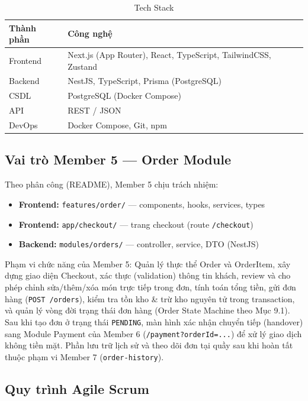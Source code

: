 \documentclass[12pt,a4paper]{article}
\begin{document}
\begin{table}[H]
\centering
\caption{Tech Stack}
\begin{tabularx}{\textwidth}{lX}
\toprule
\textbf{Thành phần} & \textbf{Công nghệ} \\
\midrule
Frontend  & Next.js (App Router), React, TypeScript, TailwindCSS, Zustand \\
Backend   & NestJS, TypeScript, Prisma (PostgreSQL) \\
CSDL      & PostgreSQL (Docker Compose) \\
API       & REST / JSON \\
DevOps    & Docker Compose, Git, npm \\
\bottomrule
\end{tabularx}
\end{table}

\subsection{Vai trò Member 5 — Order Module}

Theo phân công (README), Member 5 chịu trách nhiệm:
\begin{itemize}
  \item \textbf{Frontend:} \texttt{features/order/} — components, hooks, services, types
  \item \textbf{Frontend:} \texttt{app/checkout/} — trang checkout (route \texttt{/checkout})
  \item \textbf{Backend:} \texttt{modules/orders/} — controller, service, DTO (NestJS)
\end{itemize}

Phạm vi chức năng của Member 5: Quản lý thực thể Order và OrderItem, xây dựng giao diện Checkout, xác thực (validation) thông tin khách, review và cho phép chỉnh sửa/thêm/xóa món trực tiếp trong đơn, tính toán tổng tiền, gửi đơn hàng (\texttt{POST /orders}), kiểm tra tồn kho \& trừ kho nguyên tử trong transaction, và quản lý vòng đời trạng thái đơn hàng (Order State Machine theo Mục 9.1). Sau khi tạo đơn ở trạng thái \texttt{PENDING}, màn hình xác nhận chuyển tiếp (handover) sang Module Payment của Member 6 (\texttt{/payment?orderId=...}) để xử lý giao dịch không tiền mặt. Phần lưu trữ lịch sử và theo dõi đơn tại quầy sau khi hoàn tất thuộc phạm vi Member 7 (\texttt{order-history}).

\subsection{Quy trình Agile Scrum}
\end{document}
